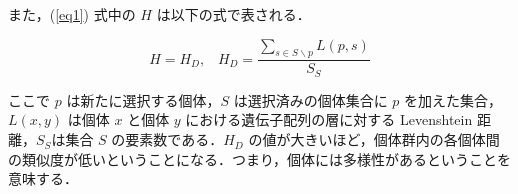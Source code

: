 \documentclass[twocolumn]{jarticle}     %
\begin{document}


また，(\ref{eq1}) 式中の $H$ は以下の式で表される．

\begin{equation}
    H = H_{D}, \hspace{10pt} H_{D} = \frac{\sum_{s \in S \backslash p} L(p, s)}{S_S}
    \label{eq4}
\end{equation}

ここで $p$ は新たに選択する個体，$S$ は選択済みの個体集合に $p$ を加えた集合，$L(x, y)$ は個体 $x$ と個体 $y$ における遺伝子配列の層に対する Levenshtein 距離，$S_S$は集合 $S$ の要素数である．$H_{D}$ の値が大きいほど，個体群内の各個体間の類似度が低いということになる．つまり，個体には多様性があるということを意味する．
\end{document}
